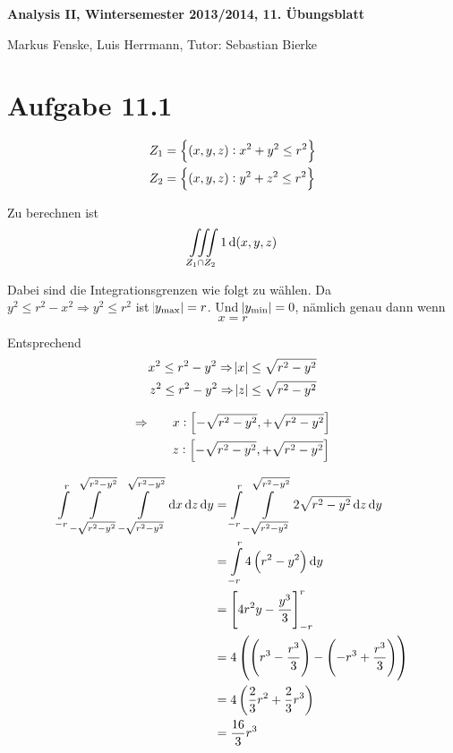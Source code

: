 \documentclass[a4paper,german,12pt,smallheadings]{scrartcl}
\begin{document}
\begin{center}
\bfseries %
\sffamily %
\vspace{-40pt}
Analysis II, Wintersemester 2013/2014, 11. Übungsblatt

Markus Fenske, Luis Herrmann, Tutor: Sebastian Bierke
\vspace{-10pt}
\end{center}
\allowdisplaybreaks %
\section*{Aufgabe 11.1}
\begin{align*}
  Z_1 &= \cbr{(x,y,z): x^2+y^2 \le r^2} \\
  Z_2 &= \cbr{(x,y,z): y^2+z^2 \le r^2}
\end{align*}

Zu berechnen ist
\begin{equation*}
  \iiint\limits_{Z_1 \cap Z_2} 1 \dif\del{x,y,z}
\end{equation*}

Dabei sind die Integrationsgrenzen wie folgt zu wählen. Da $y^2 \le r^2 - x^2
\Rightarrow y^2 \le r^2$ ist $\envert{y_\text{max}} = r$. Und $\envert{y_\text{min}} = 0$, nämlich genau dann wenn
\begin{equation*}
  x = r
\end{equation*}

Entsprechend
\begin{align*}
  x^2 \le r^2 - y^2 \Rightarrow \envert{x} &\le \sqrt{r^2 - y^2} \\
  z^2 \le r^2 - y^2 \Rightarrow \envert{z} &\le \sqrt{r^2 - y^2} \\
\end{align*}

\begin{align*}
  \Rightarrow \qquad &x: \sbr{- \sqrt{r^2 - y^2}, + \sqrt{r^2 - y^2}} \\
              &z: \sbr{- \sqrt{r^2 - y^2}, + \sqrt{r^2 - y^2}} \\
\end{align*}

\begin{align*}
  \int\limits_{-r}^r
  \int\limits_{-\sqrt{r^2 - y^2}}^{\sqrt{r^2 - y^2}}
  \int\limits_{-\sqrt{r^2 - y^2}}^{\sqrt{r^2 - y^2}}
  \dif x \dif z \dif y
  &=
  \int\limits_{-r}^r
  \int\limits_{-\sqrt{r^2 - y^2}}^{\sqrt{r^2 - y^2}}
  2 \sqrt{r^2 - y^2}
  \dif z \dif y \\
  &=
  \int\limits_{-r}^r
  4 \del{r^2 - y^2}
  \dif y \\
  &= \sbr{4r^2y - \frac{y^3}{3}}_{-r}^{r} \\
  &= 4 \del{\del{r^3 - \frac{r^3}{3}} - \del{-r^3 + \frac{r^3}{3}}} \\
  &= 4 \del{\frac{2}{3}r^2 + \frac{2}{3}r^3} \\
  &= \frac{16}{3} r^3
\end{align*}
\end{document}
